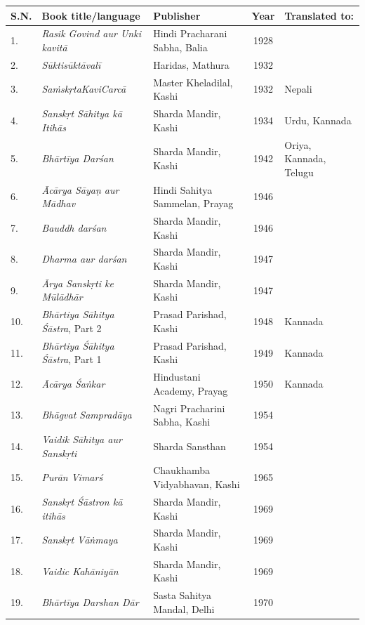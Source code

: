 \begin{longtable}{|l|p{2.9cm}|p{1.8cm}|c|p{1.6cm}|}
\hline
\textbf{S.N.} & \textbf{Book title/\-language} & \textbf{Publisher} & \textbf{Year} & \textbf{Translated to:} \\
\hline
1. & \textit{Rasik Govind aur Unki kavitā} & Hindi Pracharani Sabha, Balia & 1928 &   \\
\hline
2. & \textit{Sūktisūktāvalī} & Haridas, Mathura & 1932 &   \\
\hline
3. & \textit{SaṁskṛtaKaviCarcā} & Master Kheladilal, Kashi & 1932 & Nepali \\
\hline
4. & \textit{Sanskṛt Sāhitya kā Itihās} & Sharda Mandir, Kashi & 1934 & Urdu, Kannada \\
\hline
5. & \textit{Bhārtīya Darśan} & Sharda Mandir, Kashi & 1942 & Oriya, Kannada, Telugu \\
\hline
6. & \textit{Ācārya Sāyaṇ aur Mādhav} & Hindi Sahitya Sammelan, Prayag & 1946 &   \\
\hline
7. & \textit{Bauddh darśan} & Sharda Mandir, Kashi & 1946 &   \\
\hline
8. & \textit{Dharma aur darśan} & Sharda Mandir, Kashi & 1947 &   \\
\hline
9. & \textit{Ārya Sanskṛti ke Mūlādhār} & Sharda Mandir, Kashi & 1947 &   \\
\hline
10. & \textit{Bhārtiya Sāhitya Śāstra}, Part 2 & Prasad Parishad, Kashi & 1948 & Kannada \\
\hline
11. & \textit{Bhārtiya Śāhitya Śāstra}, Part 1 & Prasad Parishad, Kashi & 1949 & Kannada \\
\hline
12. & \textit{Ācārya Śaṅkar} & Hindustani Academy, Prayag & 1950 & Kannada \\
\hline
13. & \textit{Bhāgvat Sampradāya} & Nagri Pracharini Sabha, Kashi & 1954 &   \\
\hline
14. & \textit{Vaidik Sāhitya aur Sanskṛti} & Sharda Sansthan & 1954 &   \\
\hline
15. & \textit{Purān Vimarś} & Chaukhamba Vidyabhavan, Kashi & 1965 &   \\
\hline
16. & \textit{Sanskṛt Śāstron kā itihās} & Sharda Mandir, Kashi & 1969 &   \\
\hline
17. & \textit{Sanskṛt Vāṅmaya} & Sharda Mandir, Kashi & 1969 &   \\
\hline
18. & \textit{Vaidic Kahāniyān} & Sharda Mandir, Kashi & 1969 &   \\
\hline
19. & \textit{Bhārtīya Darshan Dār} & Sasta Sahitya Mandal, Delhi & 1970 &   \\

\end{longtable}
